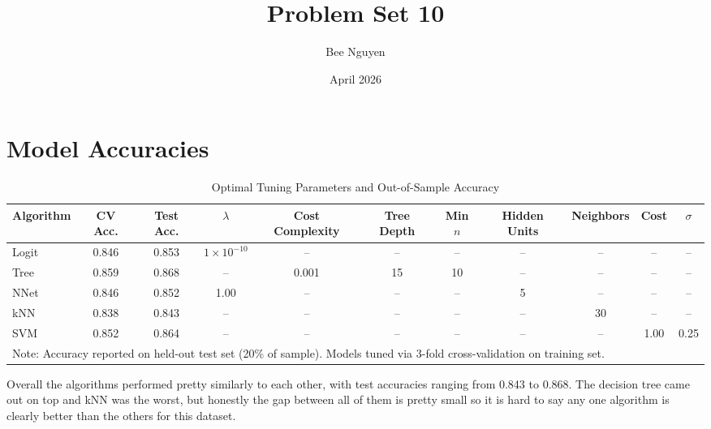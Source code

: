 \documentclass{article}
\title{Problem Set 10}
\author{Bee Nguyen}
\date{April 2026}
\begin{document}
\maketitle

\begin{table}
\section{Model Accuracies}

\centering
\caption{Optimal Tuning Parameters and Out-of-Sample Accuracy}
\begin{tabular}{lcccccccccc}
\toprule
Algorithm & CV Acc. & Test Acc. & $\lambda$ & Cost Complexity & Tree Depth & Min $n$ & Hidden Units & Neighbors & Cost & $\sigma$ \\
\midrule
Logit & 0.846 & 0.853 & $1\times10^{-10}$ & --   & --  & --  & --  & --  & --   & --   \\
Tree  & 0.859 & 0.868 & --                & 0.001 & 15 & 10  & --  & --  & --   & --   \\
NNet  & 0.846 & 0.852 & 1.00              & --   & --  & --  & 5   & --  & --   & --   \\
kNN   & 0.838 & 0.843 & --                & --   & --  & --  & --  & 30  & --   & --   \\
SVM   & 0.852 & 0.864 & --                & --   & --  & --  & --  & --  & 1.00 & 0.25 \\
\bottomrule
\multicolumn{11}{l}{\footnotesize Note: Accuracy reported on held-out test set (20\% of sample). Models tuned via 3-fold cross-validation on training set.} \\
\end{tabular}
\end{table}
 
Overall the algorithms performed pretty similarly to each other, with test accuracies ranging from 0.843 to 0.868. The decision tree came out on top and kNN was the worst, but honestly the gap between all of them is pretty small so it is hard to say any one algorithm is clearly better than the others for this dataset.
\end{document}
